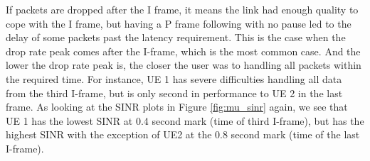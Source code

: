 
If packets are dropped after the I frame, it means the link had enough quality to cope with the I frame, but having a P frame following with no pause led to the delay of some packets past the latency requirement. This is the case when the drop rate peak comes after the I-frame, which is the most common case. And the lower the drop rate peak is, the closer the user was to handling all packets within the required time. For instance, UE 1 has severe difficulties handling all data from the third I-frame, but is only second in performance to UE 2 in the last frame. As looking at the SINR plots in Figure \ref{fig:mu_sinr} again, we see that UE 1 has the lowest SINR at 0.4 second mark (time of third I-frame), but has the highest SINR with the exception of UE2 at the 0.8 second mark (time of the last I-frame).


